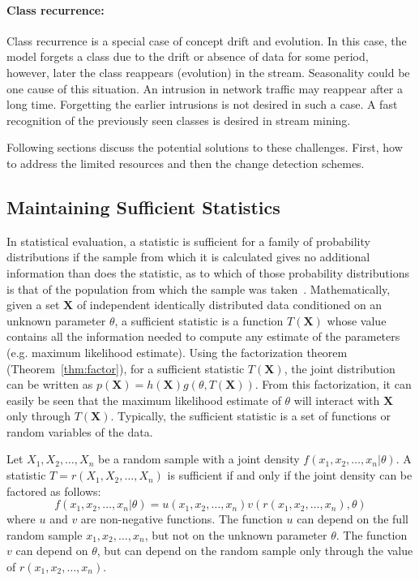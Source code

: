 \paragraph{Class recurrence:}
Class recurrence is a special case of concept drift and evolution. In this case, the model forgets a class due to the drift or absence of data for some period, however, later the class reappears (evolution) in the stream. Seasonality could be one cause of this situation. An intrusion in network traffic may reappear after a long time. Forgetting the earlier intrusions is not desired in such a case. A fast recognition of the previously seen classes is desired in stream mining.

Following sections discuss the potential solutions to these challenges. First, how to address the limited resources and then the change detection schemes.

\subsection{Maintaining Sufficient Statistics}
In statistical evaluation, a statistic is sufficient for a family of probability distributions if the sample from which it is calculated gives no additional information than does the statistic, as to which of those probability distributions is that of the population from which the sample was taken~\cite{fisher22:suffstat}. Mathematically, given a set  $\mathbf{X}$ of independent identically distributed data conditioned on an unknown parameter $\theta$, a sufficient statistic is a function $T(\mathbf{X})$ whose value contains all the information needed to compute any estimate of the parameters (e.g. maximum likelihood estimate). Using the factorization theorem (Theorem~\ref{thm:factor}), for a sufficient statistic $T(\mathbf{X})$, the joint distribution can be written as $ p(\mathbf{X}) = h(\mathbf{X}) g(\theta, T(\mathbf{X}))$. From this factorization, it can easily be seen that the maximum likelihood estimate of $\theta$ will interact with $\mathbf{X}$ only through $T(\mathbf{X})$. Typically, the sufficient statistic is a set of functions or random variables of the data.

\begin{theorem}
    \label{thm:factor}
    Let $X_1, X_2, \dots , X_n$ be a random sample with a joint density $f(x_1, x_2, \dots , x_n| \theta)$. A statistic $T = r(X_1, X_2, \dots , X_n)$ is sufficient if and only if the joint density can be factored as follows:
    \[
    f(x_1, x_2, \dots , x_n| \theta) = u(x_1, x_2, \dots , x_n) v(r(x_1, x_2, \dots , x_n), \theta)
    \]
    where $u$ and $v$ are non-negative functions. The function $u$ can depend on the full random sample $x_1, x_2, \dots , x_n$, but not on the unknown parameter $\theta$. The function $v$ can depend on $\theta$, but can depend on the random sample only through the value of $r(x_1, x_2, \dots , x_n)$.
\end{theorem}

